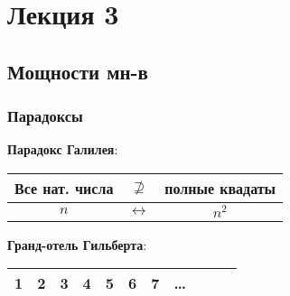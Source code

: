 \section{Лекция 3}

\subsection{Мощности мн-в}

\subsubsection{Парадоксы}

\textbf{Парадокс Галилея}:
\begin{center}
\begin{tabular}{ |c|c|c| } 
 \hline
 Все нат. числа & $\not\supseteq$ & полные квадаты \\
 \hline
 $n$ & $\longleftrightarrow$ & $n^{2}$ \\
 \hline
\end{tabular}
\end{center}
\textbf{Гранд-отель Гильберта}:
\begin{center}
\begin{tabular}{ |c|c|c|c|c|c|c|c|c|c|c| } 
 \hline
 1 & 2 & 3 & 4 & 5 & 6 & 7 & \ldots\\ 
 \hline
\end{tabular}
\end{center}
